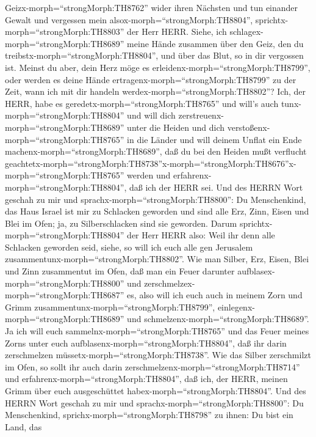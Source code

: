 Geizx-morph=``strongMorph:TH8762'' wider ihren Nächsten und tun einander
Gewalt und vergessen mein alsox-morph=``strongMorph:TH8804'',
sprichtx-morph=``strongMorph:TH8803'' der Herr HERR. 
Siehe, ich schlagex-morph=``strongMorph:TH8689'' meine Hände zusammen
über den Geiz, den du treibstx-morph=``strongMorph:TH8804'', und über
das Blut, so in dir vergossen ist.  Meinst du aber, dein
Herz möge es erleidenx-morph=``strongMorph:TH8799'', oder werden es
deine Hände ertragenx-morph=``strongMorph:TH8799'' zu der Zeit, wann ich
mit dir handeln werdex-morph=``strongMorph:TH8802''? Ich, der HERR, habe
es geredetx-morph=``strongMorph:TH8765'' und will's auch
tunx-morph=``strongMorph:TH8804''  und will dich
zerstreuenx-morph=``strongMorph:TH8689'' unter die Heiden und dich
verstoßenx-morph=``strongMorph:TH8765'' in die Länder und will deinem
Unflat ein Ende machenx-morph=``strongMorph:TH8689'',  daß
du bei den Heiden mußt verflucht
geachtetx-morph=``strongMorph:TH8738''\textbar x-morph=``strongMorph:TH8676''x-morph=``strongMorph:TH8765''
werden und erfahrenx-morph=``strongMorph:TH8804'', daß ich der HERR sei.
 Und des HERRN Wort geschah zu mir und
sprachx-morph=``strongMorph:TH8800'':  Du Menschenkind, das
Haus Israel ist mir zu Schlacken geworden und sind alle Erz, Zinn, Eisen
und Blei im Ofen; ja, zu Silberschlacken sind sie geworden.
 Darum sprichtx-morph=``strongMorph:TH8804'' der Herr HERR
also: Weil ihr denn alle Schlacken geworden seid, siehe, so will ich
euch alle gen Jerusalem zusammentunx-morph=``strongMorph:TH8802''.
 Wie man Silber, Erz, Eisen, Blei und Zinn zusammentut im
Ofen, daß man ein Feuer darunter aufblasex-morph=``strongMorph:TH8800''
und zerschmelzex-morph=``strongMorph:TH8687'' es, also will ich euch
auch in meinem Zorn und Grimm zusammentunx-morph=``strongMorph:TH8799'',
einlegenx-morph=``strongMorph:TH8689'' und
schmelzenx-morph=``strongMorph:TH8689''.  Ja ich will euch
sammelnx-morph=``strongMorph:TH8765'' und das Feuer meines Zorns unter
euch aufblasenx-morph=``strongMorph:TH8804'', daß ihr darin zerschmelzen
müssetx-morph=``strongMorph:TH8738''.  Wie das Silber
zerschmilzt im Ofen, so sollt ihr auch darin
zerschmelzenx-morph=``strongMorph:TH8714'' und
erfahrenx-morph=``strongMorph:TH8804'', daß ich, der HERR, meinen Grimm
über euch ausgeschüttet habex-morph=``strongMorph:TH8804''.
 Und des HERRN Wort geschah zu mir und
sprachx-morph=``strongMorph:TH8800'':  Du Menschenkind,
sprichx-morph=``strongMorph:TH8798'' zu ihnen: Du bist ein Land, das
